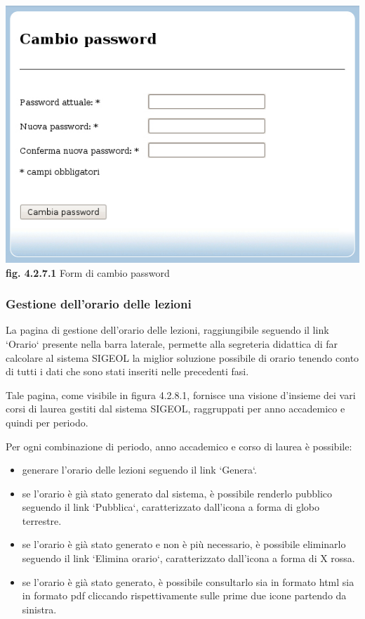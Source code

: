 \documentclass[11pt,a4paper]{article}
\begin{document}
\bigskip
\begin{center}
	\includegraphics[scale=0.5]{images/cambio_password.jpg}\\
	\textbf{fig. 4.2.7.1} Form di cambio password\\
\end{center}
\bigskip

\subsubsection{Gestione dell'orario delle lezioni}
La pagina di gestione dell'orario delle lezioni, raggiungibile seguendo il link `Orario` presente nella barra laterale, permette alla segreteria didattica di far calcolare al sistema SIGEOL la miglior soluzione possibile di orario tenendo conto di tutti i dati che sono stati inseriti nelle precedenti fasi.

Tale pagina, come visibile in figura 4.2.8.1, fornisce una visione d'insieme dei vari corsi di laurea gestiti dal sistema SIGEOL, raggruppati per anno accademico e quindi per periodo.

Per ogni combinazione di periodo, anno accademico e corso di laurea è possibile:
\begin{itemize}
 \item generare l'orario delle lezioni seguendo il link `Genera`.
 \item se l'orario è già stato generato dal sistema, è possibile renderlo pubblico seguendo il link `Pubblica`, caratterizzato dall'icona a forma di globo terrestre. 
 \item se l'orario è già stato generato e non è più necessario, è possibile eliminarlo seguendo il link `Elimina orario`, caratterizzato dall'icona a forma di X rossa.
 \item se l'orario è già stato generato, è possibile consultarlo sia in formato html sia in formato pdf cliccando rispettivamente sulle prime due icone partendo da sinistra.
\end{itemize}
\end{document}
